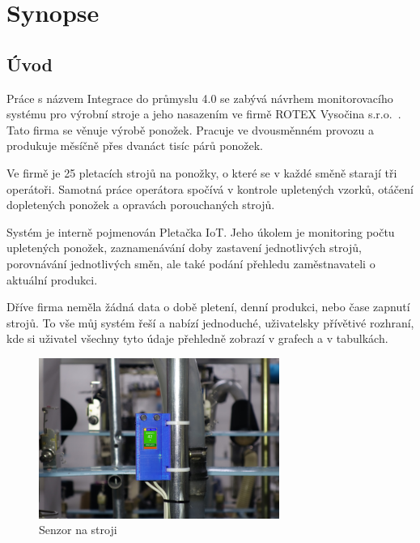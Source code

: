 \documentclass[12pt, a4paper]{article}
\begin{document}
\section*{Synopse}

\subsection*{Úvod}
Práce s názvem Integrace do průmyslu 4.0 se zabývá návrhem monitorovacího systému pro výrobní stroje a jeho nasazením ve firmě ROTEX Vysočina s.r.o.~\cite{ROTEX}. Tato firma se věnuje výrobě ponožek. Pracuje ve dvousměnném provozu a produkuje měsíčně přes dvanáct tisíc párů ponožek.

Ve firmě je 25 pletacích strojů na ponožky, o které se v každé směně starají tři operátoři.
Samotná práce operátora spočívá v kontrole upletených vzorků, otáčení dopletených ponožek a opravách porouchaných strojů.

Systém je interně pojmenován Pletačka IoT. 
Jeho úkolem je monitoring počtu upletených ponožek, zaznamenávání doby zastavení jednotlivých strojů, porovnávání jednotlivých směn, ale také podání přehledu zaměstnavateli o aktuální produkci.

Dříve firma neměla žádná data o době pletení, denní  produkci, nebo čase zapnutí strojů.
To vše  můj systém řeší  a nabízí jednoduché, uživatelsky přívětivé rozhraní, kde si uživatel všechny tyto údaje přehledně zobrazí v grafech a v tabulkách.

\begin{figure}[t]
    \centering
    \includegraphics[width=0.7\textwidth]{img/V2-uchyceni.png}
    \caption{Senzor na stroji}
    \label{fig:SenzorNaStroji}
\end{figure}


\end{document}
